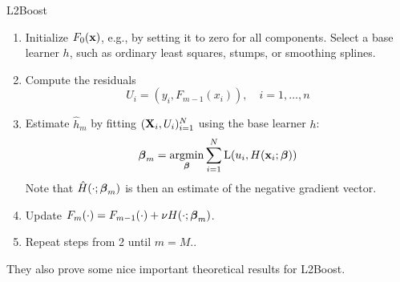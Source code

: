\begin{algorithm}
\caption{L2Boost}
\label{algo:l2}
\begin{enumerate}
    \item Initialize $F_0(\mathbf{x})$, e.g., by setting it to zero for all components. Select a base learner $h$, such as ordinary least squares, stumps, or smoothing splines.
    \item Compute the residuals
        \begin{equation*}
            U_i=(y_i,F_{m-1}(x_i)),\quad i=1,\dotsc,n
        \end{equation*}
    \item Estimate $\hat{h}_m$ by fitting $(\mathbf{X}_i,U_i)_{i=1}^N$ using the base learner $h$:
        \begin{equation*}
            \boldsymbol{\beta}_m=\operatorname*{argmin}_{\boldsymbol{\beta}}\sum_{i=1}^N\operatorname{L}(u_i,H(\mathbf{x}_i;\boldsymbol{\beta}))
        \end{equation*}
        Note that $\hat{H}(\cdot;\boldsymbol{\beta}_m)$ is then an estimate of the negative gradient vector.
    \item Update $F_m(\cdot)=F_{m-1}(\cdot)+\nu H(\cdot;\boldsymbol{\beta}_m)$.
    \item Repeat steps from 2 until $m=M$..
\end{enumerate}
\end{algorithm}
They also prove some nice important theoretical results for L2Boost.

